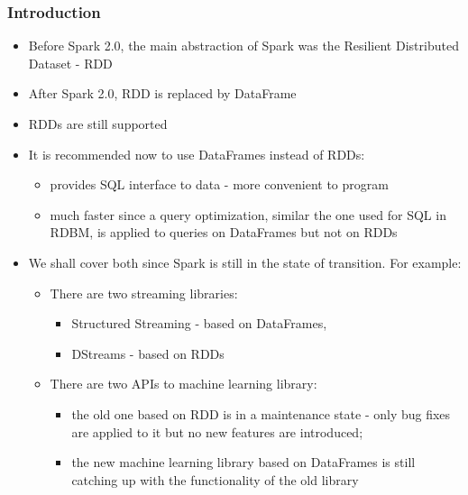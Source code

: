 \documentclass{beamer}
\begin{document}
\begin{frame}[fragile]
  \frametitle{Introduction}
  
\begin{itemize}
\item Before Spark 2.0, the main abstraction of Spark was the {\color{mycolordef}R}esilient {\color{mycolordef}D}istributed {\color{mycolordef}D}ataset  - {\color{mycolordef}RDD}
\item After Spark 2.0, RDD is replaced by {\color{mycolordef}DataFrame}
\item RDDs are still supported
\item It is recommended now to use {\color{mycolordef}DataFrames} instead of RDDs: 
  \begin{itemize}
  \item provides SQL interface to data - more convenient to program
  \item much faster since a query optimization, similar the one used for SQL in RDBM, is applied to queries on DataFrames but not on RDDs
  \end{itemize}
\item We shall cover both since Spark is still in the state of transition. For example:
  \begin{itemize}
    \item There are two streaming libraries: 
      \begin{itemize}
      \item {\color{mycolordef}Structured Streaming}  - based on DataFrames, 
      \item {\color{mycolordef}DStreams} - based on RDDs
      \end{itemize}
    \item There are two APIs to machine learning library: 
      \begin{itemize}
      \item the old one based on RDD is in a maintenance state - only bug fixes are applied to it but no new features are introduced; 
      \item the new machine learning library based on DataFrames is still catching up with the functionality of the old library
      \end{itemize}
  \end{itemize}
\end{itemize}

\end{frame}
\end{document}
